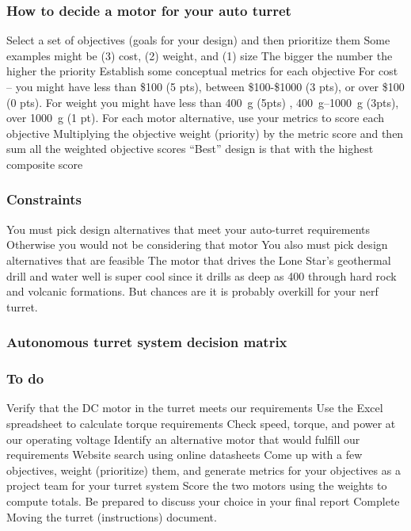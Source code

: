 \documentclass[aspectratio=169]{beamer}
\begin{document}
\begin{frame}
\frametitle{How to decide a motor for your auto turret}
Select a set of objectives (goals for your design) and then prioritize them
Some examples might be (3) cost, (2) weight, and (1) size
The bigger the number the higher the priority
Establish some conceptual metrics for each objective
For cost – you might have less than \$100 (5 pts), between \$100-\$1000 (3 pts), or over \$100 (0 pts).  For weight you might have less than \SI{400}{\gram} (5pts) , \SIrange{400}{1000}{\gram} (3pts), over \SI{1000}{\gram} (1 pt). 
For each motor alternative, use your metrics to score each objective 
Multiplying the objective weight (priority) by the metric score and then sum all the weighted objective scores
``Best'' design is that with the highest composite score
\end{frame}

\begin{frame}
\frametitle{Constraints}
You must pick design alternatives that meet your auto-turret requirements
Otherwise you would not be considering that motor
You also must pick design alternatives that are feasible
The motor that drives the Lone Star's geothermal drill and water well is super cool since it drills as deep as \SI{400}{\foot} through hard rock and volcanic formations.  But chances are it is probably overkill for your nerf turret.
\end{frame}

\begin{frame}
\frametitle{Autonomous turret system decision matrix}
\end{frame}

\begin{frame}
\frametitle{To do}
Verify that the DC motor in the turret meets our requirements 
Use the Excel spreadsheet to calculate torque requirements
Check speed, torque, and power at our operating voltage
Identify an alternative motor that would fulfill our requirements
Website search using online datasheets
Come up with a few objectives, weight (prioritize) them, and generate metrics for your objectives as a project team for your turret system
Score the two motors using the weights to compute totals. 
Be prepared to discuss your choice in your final report
Complete Moving the turret (instructions) document.
\end{frame}
\end{document}
